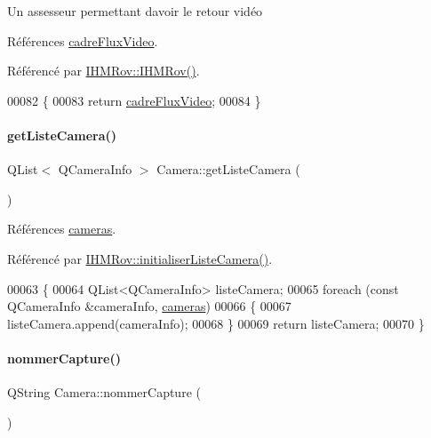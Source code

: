 Un assesseur permettant d\textquotesingle{}avoir le retour vidéo 

Références \hyperlink{class_camera_abf5fd38d19f0f06dfd7ec9e37f73adb8}{cadre\+Flux\+Video}.



Référencé par \hyperlink{class_i_h_m_rov_a5dac1fb4612866cc61f699a415e0ef6b}{I\+H\+M\+Rov\+::\+I\+H\+M\+Rov()}.


\begin{DoxyCode}
00082 \{
00083     \textcolor{keywordflow}{return} \hyperlink{class_camera_abf5fd38d19f0f06dfd7ec9e37f73adb8}{cadreFluxVideo};
00084 \}
\end{DoxyCode}
\mbox{\label{class_camera_ad8a2a21d3701375a553c7c90646c694f}} 
\paragraph{\texorpdfstring{get\+Liste\+Camera()}{getListeCamera()}}
{\footnotesize\ttfamily Q\+List$<$ Q\+Camera\+Info $>$ Camera\+::get\+Liste\+Camera (\begin{DoxyParamCaption}{ }\end{DoxyParamCaption})}



Références \hyperlink{class_camera_a3bea5177e857533a53cb94135bee8c6b}{cameras}.



Référencé par \hyperlink{class_i_h_m_rov_af3e46f174ab2fdeaebb2d00e6b8bcb33}{I\+H\+M\+Rov\+::initialiser\+Liste\+Camera()}.


\begin{DoxyCode}
00063 \{
00064     QList<QCameraInfo> listeCamera;
00065     \textcolor{keywordflow}{foreach} (\textcolor{keyword}{const} QCameraInfo &cameraInfo, \hyperlink{class_camera_a3bea5177e857533a53cb94135bee8c6b}{cameras})
00066     \{
00067         listeCamera.append(cameraInfo);
00068     \}
00069     \textcolor{keywordflow}{return} listeCamera;
00070 \}
\end{DoxyCode}
\mbox{\label{class_camera_a60d2c9f16b6f235ab6dd0360c883e0d0}} 
\paragraph{\texorpdfstring{nommer\+Capture()}{nommerCapture()}}
{\footnotesize\ttfamily Q\+String Camera\+::nommer\+Capture (\begin{DoxyParamCaption}{ }\end{DoxyParamCaption})\hspace{0.3cm}{\ttfamily [private]}}

